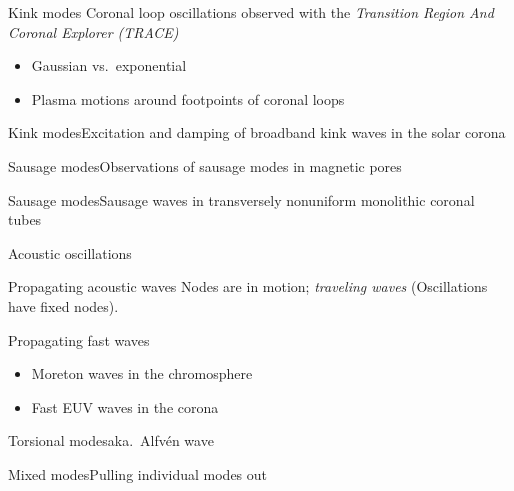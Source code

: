 \documentclass[table]{beamer}
\begin{document}
\begin{frame}{Kink modes}
{Coronal loop oscillations observed with the
\emph{Transition Region And Coronal Explorer (TRACE)}}
    \begin{itemize}
        \item Gaussian vs.\ exponential
        \item Plasma motions around footpoints of coronal loops
    \end{itemize}
\end{frame}%
\begin{frame}{Kink modes}{Excitation and damping of broadband kink waves
    in the solar corona}
\end{frame}%
\begin{frame}{Sausage modes}{Observations of sausage modes in magnetic pores}
\end{frame}%
\begin{frame}{Sausage modes}{Sausage waves in transversely nonuniform
    monolithic coronal tubes}
\end{frame}%
\begin{frame}{Acoustic oscillations}
\end{frame}%
\begin{frame}{Propagating acoustic waves}
    Nodes are in motion; \emph{traveling waves}
    (Oscillations have fixed nodes).
\end{frame}%
\begin{frame}{Propagating fast waves}
    \begin{itemize}
        \item Moreton waves in the chromosphere
        \item Fast EUV waves in the corona
    \end{itemize}
\end{frame}%
\begin{frame}{Torsional modes}{aka.\ Alfv\'en wave}
\end{frame}%
\begin{frame}{Mixed modes}{Pulling individual modes out}
\end{frame}%
\end{document}
